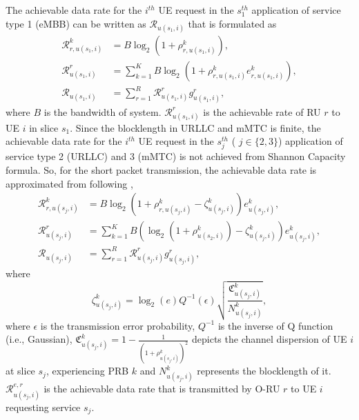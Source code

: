 \documentclass[lettersize,journal]{IEEEtran}
\begin{document}
The achievable data rate for the $i^{th}$ UE request in the $s_{1}^{th}$ application of service type 1 (eMBB) can be written as $\mathcal{R}_{u(s_1,i)}$ that is formulated as
\begin{equation}\label{eq3}
\begin{split}
\mathcal{{R}}_{r,u(s_1,i)}^{k} &=  B \log_2({1+ \rho_{r,u(s_1,i)}^{k}}) ,\\
\mathcal{R}_{u(s_1,i)}^{r} &= \sum_{k=1}^{K} B \log_2({1+ \rho_{r,u(s_1,i)}^{k}} e^k_{r,u(s_1,i)}),\\
\mathcal{R}_{u(s_1,i)} &= \sum_{r=1}^{R}\mathcal{R}_{u(s_1,i)}^{r} g^r_{u(s_1,i)},
\end{split}
\end{equation}
where $B$ is the bandwidth of system. 
$\mathcal{R}_{u(s_1,i)}^{r}$ is the achievable rate of RU $r$ to UE $i$ in slice $s_1$.
Since the blocklength in URLLC and mMTC is finite, the achievable data rate for the $i^{th}$ UE request in the $s_{j}^{th}$ ( $j \in \{2,3\}$) application of service type 2 (URLLC) and 3 (mMTC) is not achieved from Shannon Capacity formula. So, for the short packet transmission, the achievable data rate is approximated from following \cite{setayesh2020joint},
\begin{subequations}\label{eq11}
\begin{alignat}{4}
\mathcal{{R}}_{r,u(s_j,i)}^{k} &= B \log_2({1+ \rho_{r,u(s_j,i)}^{k}} - \zeta_{u(s_j,i)}^{k}){e}_{u(s_j,i)}^{k},\\
\mathcal{R}_{u(s_j,i)}^{r} &= \sum_{k=1}^{K} B (\log_2({1+ \rho_{u(s_2,i)}^{k}})- \zeta_{u(s_j,i)}^{k}){e}_{u(s_j,i)}^{k},\\
\mathcal{R}_{u(s_j,i)} &= \sum_{r=1}^{R}\mathcal{R}_{u(s_j,i)}^{r} g^r_{u(s_j,i)},
\end{alignat}
\end{subequations}
where %
\begin{equation}\label{shortPacket}
 \zeta_{u(s_j,i)}^{k} = \log_2({e})Q^{-1}(\epsilon) \sqrt{\frac{\mathfrak{C}_{u(s_j,i)}^{k}}{N_{u(s_j,i)}^{k}}}, 
\end{equation}
where $\epsilon$ is the transmission error probability, $Q^{-1}$ is the inverse of Q function (i.e., Gaussian),
$\mathfrak{C}_{u(s_j,i)}^{k} = 1 - \frac{1}{(1+\rho_{u(s_j,i)}^{k})^2}$ depicts the channel dispersion of UE  $i$ at slice $s_j$, experiencing PRB $k$ and
$N_{u(s_j,i)}^{k}$ represents the blocklength of it. 
$\mathcal{R}_{u(s_j,i)}^{e,r}$ is the achievable data rate that is transmitted by O-RU $r$ to UE $i$ requesting service $s_j$.
\end{document}
